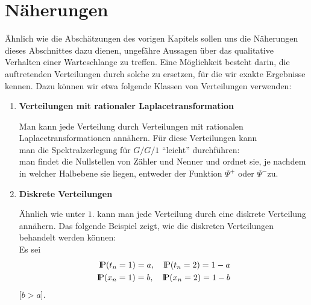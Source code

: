 \section{Näherungen}
\bigskip
Ähnlich wie die Abschätzungen des vorigen Kapitels sollen uns die Näherungen dieses Abschnittes dazu dienen, ungefähre Aussagen über das qualitative
Verhalten einer Warteschlange zu treffen. Eine Möglichkeit besteht darin, die auftretenden Verteilungen durch solche zu ersetzen, für die wir exakte Ergebnisse
kennen. Dazu können wir etwa folgende Klassen von Verteilungen verwenden:
\begin{enumerate}

\item {\bf Verteilungen mit rationaler Laplacetransformation}

Man kann jede Verteilung durch Verteilungen mit rationalen Laplacetransformationen annähern. Für diese Verteilungen kann \\
 man die Spektralzerlegung für $G/G/1$ \enquote{leicht} durchführen: \\
man findet die Nullstellen von Zähler und Nenner und ordnet sie, je nachdem in welcher Halbebene sie liegen, entweder
der Funktion $\Psi^{+}$ oder $\Psi^{-}$zu.

\item {\bf Diskrete Verteilungen}

Ähnlich wie unter $1.$ kann man jede Verteilung durch eine diskrete Verteilung annähern. Das folgende Beispiel zeigt, wie die diskreten Verteilungen behandelt
werden können:\\
Es sei
\begin{eqnarray*}
  {\rm I\kern-0.2em P}(t_{n}=1)=a, \quad {\rm I\kern-0.2em P}(t_{n}=2)=1-a \\
  {\rm I\kern-0.2em P}(x_{n}=1)=b, \quad {\rm I\kern-0.2em P}(x_{n}=2)=1-b
\end{eqnarray*}
[$b>a$].


\end{enumerate}
